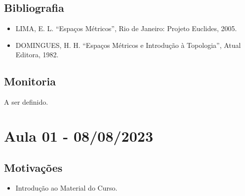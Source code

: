 \documentclass{article}
\begin{document}
\subsection{Bibliografia}
 \begin{itemize}
   \item LIMA, E. L.  ``Espaços Métricos'', Rio de Janeiro: Projeto Euclides, 2005.
   \item DOMINGUES, H. H. ``Espaços Métricos e Introdução à Topologia'', Atual Editora, 1982.
 \end{itemize}
\subsection*{Monitoria}
  A ser definido. 

 \newpage

\section{Aula 01 - 08/08/2023}
\subsection{Motivações}
\begin{itemize}
  \item Introdução ao Material do Curso.
\end{itemize}
\end{document}
